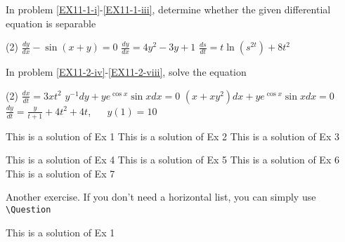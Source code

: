     \begin{Exercise}\label{EX11}
        \vspace{-\baselineskip}%
        \Question In problem \ref{EX11-1-i}-\ref{EX11-1-iii}, determine whether the given differential equation is separable  
        \begin{tasks}(2)
            \task\label{EX11-1-i} $\frac{dy}{dx}-\sin{(x+y)}=0$     
            \task $\frac{dy}{dx}=4y^2-3y+1$ 
            \task\label{EX11-1-iii} $\frac{ds}{dt}=t\ln{(s^{2t})}+8t^2$ 
        \end{tasks}
        \Question In problem \ref{EX11-2-iv}-\ref{EX11-2-viii}, solve the equation 
        \begin{tasks}[resume=true](2)
            \task\label{EX11-2-iv} $\frac{dx}{dt}=3xt^2$
            \task $y^{-1}dy+ye^{\cos{x}}\sin{x}dx=0$
            \task $(x+xy^2)dx+ye^{\cos{x}}\sin{x}dx=0$
            \task\label{EX11-2-viii} $\frac{dy}{dt} = \frac{y}{t+1} + 4t^2 +  4t$, $\quad$ $y(1) = 10$
        \end{tasks}
    \end{Exercise}
    \begin{multicols}{2}
        \begin{Answer}[ref={EX11}]
            \Question 
            \begin{tasks}
                \task This is a solution of Ex 1
                \task This is a solution of Ex 2 
                \task This is a solution of Ex 3 
            \end{tasks} 
            \Question 
            \begin{tasks}[resume=true]
                \task This is a solution of Ex 4
                \task This is a solution of Ex 5 
                \task This is a solution of Ex 6 
                \task This is a solution of Ex 7 
            \end{tasks} 
        \end{Answer}
    \end{multicols}

    \begin{Exercise}\label{EX12}
        Another exercise. 
        \Question If you don't need a horizontal list, you can simply use \verb|\Question|
    \end{Exercise}
    \begin{multicols}{2}
        \begin{Answer}[ref={EX12}]
            \Question This is a solution of Ex 1
        \end{Answer}
    \end{multicols}

